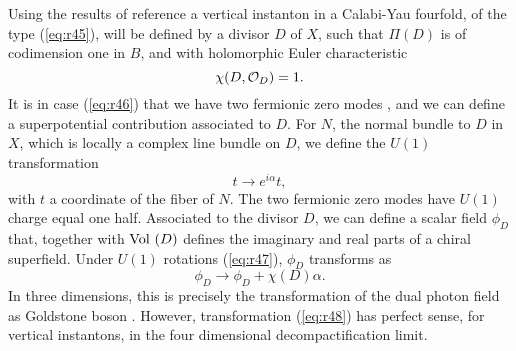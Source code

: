 Using the results of reference \cite{Wsp} a vertical instanton in a Calabi-Yau 
fourfold, of the type (\ref{eq:r45}), will be defined by a divisor $D$ 
of $X$, such that $\Pi(D)$ is of codimension one in $B$, and with holomorphic 
Euler characteristic
\begin{equation}
\chi(D,{\cal O}_D)=1.
\label{eq:r46}
\end{equation}
It is in case (\ref{eq:r46}) that we have two fermionic zero modes \cite{Wsp}, and we 
can define a superpotential contribution associated to $D$. For $N$, the 
normal bundle to $D$ in $X$, which is locally a complex line bundle on $D$, we 
define the $U(1)$ transformation
\begin{equation}
t \rightarrow e^{i \alpha}t,
\label{eq:r47}
\end{equation}
with $t$ a coordinate of the fiber of $N$. The two fermionic zero modes have 
$U(1)$ charge equal one half. Associated to the divisor $D$, we can define 
a scalar field $\phi_D$ that, together with $\hbox {Vol }(D)$ defines the 
imaginary and real parts of a chiral superfield. Under $U(1)$ rotations 
(\ref{eq:r47}), $\phi_D$ transforms as
\begin{equation}
\phi_D \rightarrow \phi_D + \chi(D) \alpha.
\label{eq:r48}
\end{equation}
In three dimensions, this is precisely the transformation of the dual photon field 
as Goldstone boson \cite{AHW}. However, transformation (\ref{eq:r48}) has perfect sense, 
for vertical instantons, in the four dimensional decompactification limit. 
  
